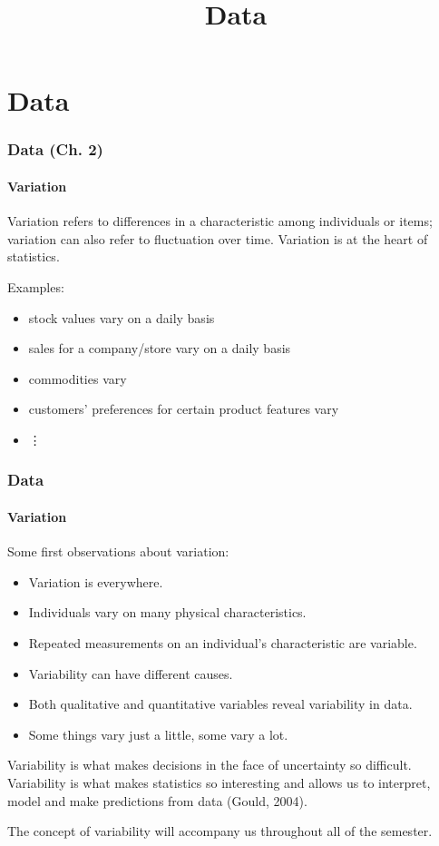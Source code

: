 \documentclass[handout]{beamer}
\title{Data}
\begin{document}
\begin{frame}
\titlepage
\end{frame}


\section{Data}
\begin{frame}
\frametitle{Data (Ch. 2)}
\framesubtitle{Variation}
\begin{definition}
\alert{Variation} refers to differences in a characteristic among individuals or 
items; 
variation can also refer to fluctuation over time. 
Variation is at the heart of statistics.
\end{definition}

\vspace{0.25cm} \pause

Examples:
\begin{itemize}[<+->]
\item stock values vary on a daily basis
\item sales for a company/store vary on a daily basis
\item commodities vary
\item customers' preferences for certain product features vary
\item \vdots
\end{itemize}
\end{frame}





\begin{frame}\frametitle{Data}
\framesubtitle{Variation}
Some first observations about variation:
\begin{itemize}
\item Variation is everywhere.
\item Individuals vary on many physical characteristics. 
\item Repeated measurements on an individual's characteristic are variable. 
\item Variability can have different causes.
\item Both qualitative and quantitative variables reveal variability in data.
\item Some things vary just a little, some vary a lot.
\end{itemize}

\vspace{0.25cm} \pause

Variability is what makes decisions in the face of uncertainty so difficult. Variability is what makes statistics so interesting and allows us to interpret, model and make predictions from data (Gould, 2004).

\vspace{0.25cm} \pause
 
The concept of variability will accompany us throughout all of the semester.
\end{frame}
\end{document}
